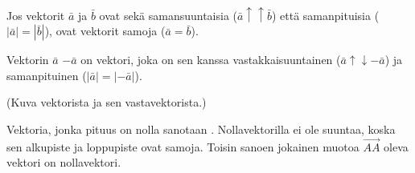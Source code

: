 Jos vektorit $\bar{a}$ ja $\bar{b}$ ovat sekä samansuuntaisia ($\bar{a} \uparrow \uparrow  \bar{b}$) että samanpituisia ($|\bar{a}| = |\bar{b}|$), ovat vektorit samoja ($\bar{a} = \bar{b}$).

Vektorin $\bar{a}$  $-\bar{a}$ on vektori, joka on sen kanssa vastakkaisuuntainen ($\bar{a} \uparrow \downarrow -\bar{a}$) ja samanpituinen ($|\bar{a}| = |-\bar{a}|$).

(Kuva vektorista ja sen vastavektorista.)

Vektoria, jonka pituus on nolla sanotaan . Nollavektorilla ei ole suuntaa, koska sen alkupiste ja loppupiste ovat samoja. Toisin sanoen jokainen muotoa $\overrightarrow{AA}$ oleva vektori on nollavektori.
 
